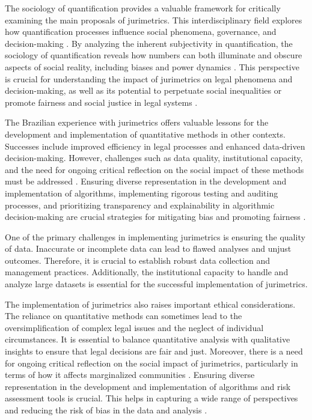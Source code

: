 The sociology of quantification provides a valuable framework for critically examining the main proposals of jurimetrics. This interdisciplinary field explores how quantification processes influence social phenomena, governance, and decision-making \cite{101111lsi12334}. By analyzing the inherent subjectivity in quantification, the sociology of quantification reveals how numbers can both illuminate and obscure aspects of social reality, including biases and power dynamics \cite{101111lsi12334, 101057s4159902003965}. This perspective is crucial for understanding the impact of jurimetrics on legal phenomena and decision-making, as well as its potential to perpetuate social inequalities or promote fairness and social justice in legal systems \cite{101111lsi12334, 101057s415990200396_5}.

The Brazilian experience with jurimetrics offers valuable lessons for the development and implementation of quantitative methods in other contexts. Successes include improved efficiency in legal processes and enhanced data-driven decision-making. However, challenges such as data quality, institutional capacity, and the need for ongoing critical reflection on the social impact of these methods must be addressed \cite{10.1007/s11186-021-09453-1,10.3390/fi9040068}. Ensuring diverse representation in the development and implementation of algorithms, implementing rigorous testing and auditing processes, and prioritizing transparency and explainability in algorithmic decision-making are crucial strategies for mitigating bias and promoting fairness \cite{10.1007/s11186-021-09453-1,10.3390/fi9040068}.

One of the primary challenges in implementing jurimetrics is ensuring the quality of data. Inaccurate or incomplete data can lead to flawed analyses and unjust outcomes. Therefore, it is crucial to establish robust data collection and management practices. Additionally, the institutional capacity to handle and analyze large datasets is essential for the successful implementation of jurimetrics.

The implementation of jurimetrics also raises important ethical considerations. The reliance on quantitative methods can sometimes lead to the oversimplification of complex legal issues and the neglect of individual circumstances. It is essential to balance quantitative analysis with qualitative insights to ensure that legal decisions are fair and just. Moreover, there is a need for ongoing critical reflection on the social impact of jurimetrics, particularly in terms of how it affects marginalized communities \cite{10.1007/s11186-021-09453-1,10.3390/fi9040068}. Ensuring diverse representation in the development and implementation of algorithms and risk assessment tools is crucial. This helps in capturing a wide range of perspectives and reducing the risk of bias in the data and analysis \cite{10.1007/s11186-021-09453-1,10.3390/fi9040068}.

